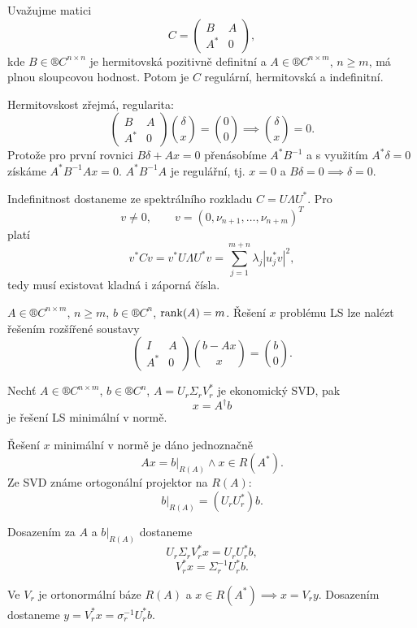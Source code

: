 \documentclass[12pt]{article}					%
\begin{document}
\begin{lemma}
	Uvažujme matici
	$$ C = \begin{pmatrix} B & A \\ A^* & 0 \end{pmatrix}, $$
	kde $B \in ®C^{n \times n}$ je hermitovská pozitivně definitní a $A \in ®C^{n \times m}$, $n ≥ m$, má plnou sloupcovou hodnost. Potom je $C$ regulární, hermitovská a indefinitní.

	\begin{dukazin}
		Hermitovskost zřejmá, regularita:
		$$ \begin{pmatrix} B & A \\ A^* & 0 \end{pmatrix} \binom{\delta}{x} = \binom{0}{0} \implies \binom{\delta}{x} = 0. $$
		Protože pro první rovnici $B\delta + Ax = 0$ přenásobíme $A^*B^{-1}$ a s využitím $A^*\delta = 0$ získáme $A^*B^{-1}Ax = 0$. $A^*B^{-1}A$ je regulářní, tj. $x = 0$ a $B \delta = 0 \implies \delta = 0$.

		Indefinitnost dostaneme ze spektrálního rozkladu $C = U\Lambda U^*$. Pro
		$$ v ≠ 0, \qquad v = (0, \nu_{n+1}, …, \nu_{n + m})^T $$
		platí
		$$ v^* C v = v^* U \Lambda U^* v = \sum_{j=1}^{m+n} \lambda_j |u_j^*v|^2, $$
		tedy musí existovat kladná i záporná čísla.
	\end{dukazin}
\end{lemma}

\begin{veta}
	$A \in ®C^{n \times m}$, $n ≥ m$, $b \in ®C^n$, $\operatorname{rank}(A) = m$. Řešení $x$ problému LS lze nalézt řešením rozšířené soustavy
	$$ \begin{pmatrix} I & A \\ A^* & 0 \end{pmatrix} \binom{b - Ax}{x} = \binom{b}{0}. $$
\end{veta}

\begin{veta}
	Nechť $A \in ®C^{n \times m}$, $b \in ®C^n$, $A = U_r \Sigma_r V_r^*$ je ekonomický SVD, pak
	$$ x = A^\dagger b $$
	je řešení LS minimální v normě.
	
	\begin{dukazin}
		Řešení $x$ minimální v normě je dáno jednoznačně
		$$ Ax = b|_{R(A)} \land x \in R(A^*). $$
		Ze SVD známe ortogonální projektor na $R(A)$:
		$$ b|_{R(A)} = (U_rU_r^*)b. $$
		
		Dosazením za $A$ a $b|_{R(A)}$ dostaneme
		$$ U_r\Sigma_rV_r^* x = U_rU_r^* b, $$
		$$ V_r^* x = \Sigma_r^{-1} U_r^* b. $$

		Ve $V_r$ je ortonormální báze $R(A)$ a $x \in R(A^*) \implies x = V_r y$. Dosazením dostaneme $y = V_r^* x = \sigma_r^{-1} U_r^* b$.
	\end{dukazin}
\end{veta}
\end{document}
